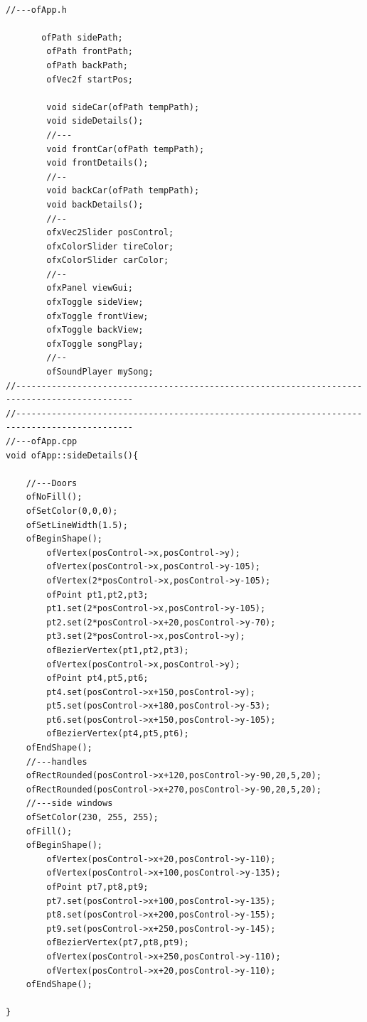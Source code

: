 \documentclass[letterpaper, 24pt, final, onecolumn, titlepage] {article}
\begin{document}
\begin{lstlisting}

//---ofApp.h

       ofPath sidePath;
        ofPath frontPath;
        ofPath backPath;
        ofVec2f startPos;

		void sideCar(ofPath tempPath);
		void sideDetails();
		//---
		void frontCar(ofPath tempPath);
		void frontDetails();
		//--
		void backCar(ofPath tempPath);
		void backDetails();
		//--
		ofxVec2Slider posControl;
		ofxColorSlider tireColor;
		ofxColorSlider carColor;
		//--
		ofxPanel viewGui;
        ofxToggle sideView;
		ofxToggle frontView;
		ofxToggle backView;
		ofxToggle songPlay;
		//--
		ofSoundPlayer mySong;
//---------------------------------------------------------------------------------------------
//---------------------------------------------------------------------------------------------
//---ofApp.cpp
void ofApp::sideDetails(){

    //---Doors
    ofNoFill();
    ofSetColor(0,0,0);
    ofSetLineWidth(1.5);
    ofBeginShape();
        ofVertex(posControl->x,posControl->y);
        ofVertex(posControl->x,posControl->y-105);
        ofVertex(2*posControl->x,posControl->y-105);
        ofPoint pt1,pt2,pt3;
        pt1.set(2*posControl->x,posControl->y-105);
        pt2.set(2*posControl->x+20,posControl->y-70);
        pt3.set(2*posControl->x,posControl->y);
        ofBezierVertex(pt1,pt2,pt3);
        ofVertex(posControl->x,posControl->y);
        ofPoint pt4,pt5,pt6;
        pt4.set(posControl->x+150,posControl->y);
        pt5.set(posControl->x+180,posControl->y-53);
        pt6.set(posControl->x+150,posControl->y-105);
        ofBezierVertex(pt4,pt5,pt6);
    ofEndShape();
    //---handles
    ofRectRounded(posControl->x+120,posControl->y-90,20,5,20);
    ofRectRounded(posControl->x+270,posControl->y-90,20,5,20);
    //---side windows
    ofSetColor(230, 255, 255);
    ofFill();
    ofBeginShape();
        ofVertex(posControl->x+20,posControl->y-110);
        ofVertex(posControl->x+100,posControl->y-135);
        ofPoint pt7,pt8,pt9;
        pt7.set(posControl->x+100,posControl->y-135);
        pt8.set(posControl->x+200,posControl->y-155);
        pt9.set(posControl->x+250,posControl->y-145);
        ofBezierVertex(pt7,pt8,pt9);
        ofVertex(posControl->x+250,posControl->y-110);
        ofVertex(posControl->x+20,posControl->y-110);
    ofEndShape();

}


\end{lstlisting}
\end{document}
